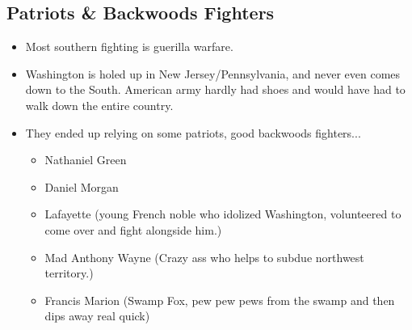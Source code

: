 \documentclass{article}
\begin{document}
  \subsection{Patriots \& Backwoods Fighters}
    \begin{itemize}
      \item Most southern fighting is guerilla warfare. 
      \item Washington is holed up in New Jersey/Pennsylvania, and never even comes down to the South. American army hardly had shoes and would have had to walk down the entire country.
      \item They ended up relying on some patriots, good backwoods fighters...
        \begin{itemize}
          \item Nathaniel Green
          \item Daniel Morgan
          \item Lafayette (young French noble who idolized Washington, volunteered to come over and fight alongside him.)
          \item Mad Anthony Wayne (Crazy ass who helps to subdue northwest territory.)
          \item Francis Marion (Swamp Fox, pew pew pews from the swamp and then dips away real quick)
        \end{itemize}
    \end{itemize}
\end{document}
